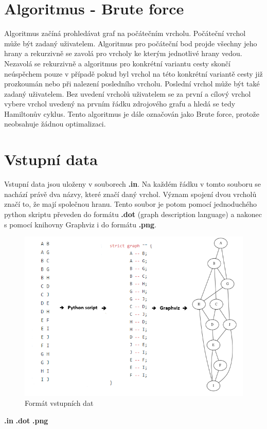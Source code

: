\documentclass[a4paper,11pt]{article}
\begin{document}
\section{Algoritmus - Brute force}

Algoritmus začíná prohledávat graf na počátečním vrcholu. Počáteční vrchol může být zadaný uživatelem. Algoritmus pro počáteční bod projde všechny jeho hrany a rekurzivně se zavolá pro vrcholy ke kterým jednotlivé hrany vedou. Nezavolá se rekurzivně a algoritmus pro konkrétní variantu cesty skončí neúspěchem pouze v případě pokud byl vrchol na této konkrétní variantě cesty již prozkoumán nebo při nalezení posledního vrcholu. Poslední vrchol může být také zadaný uživatelem. Bez uvedení vrcholů uživatelem se za první a cílový vrchol vybere vrchol uvedený na prvním řádku zdrojového grafu a hledá se tedy Hamiltonův cyklus. Tento algoritmus je dále označován jako Brute force, protože neobsahuje žádnou optimalizaci.

\section{Vstupní data}

Vstupní data jsou uloženy v souborech \textbf{.in}. Na každém řádku v tomto souboru se nachází právě dva názvy, které značí daný vrchol. Význam spojení dvou vrcholů značí to, že mají společnou hranu. Tento soubor je potom pomocí jednoduchého python skriptu převeden do formátu \textbf{.dot} (graph description language) a nakonec s pomocí knihovny Graphviz\cite{graphviz} i do formátu \textbf{.png}.

\newpage

\begin{figure}[!h]
\caption{Formát vstupních dat}
\includegraphics{./inputData.png}
\centering
\end{figure}
\hspace{0,55cm}\textbf{\LARGE{.in}} \hspace{6cm} \textbf{\LARGE{.dot}} \hspace{4,6cm} \textbf{\LARGE{.png}}
\end{document}
